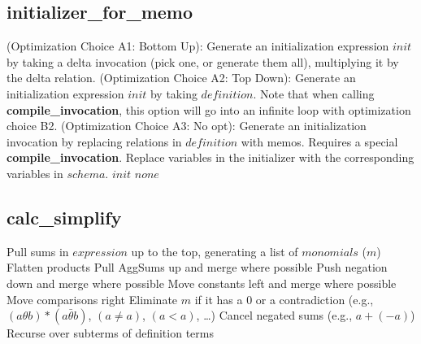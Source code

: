 \documentclass[11pt]{amsart}
\begin{document}
\subsection{initializer\_for\_memo}
\begin{algorithmic}
  \STATE (Optimization Choice A1: Bottom Up): Generate an initialization expression $init$ by taking a delta invocation (pick one, or generate them all), multiplying it by the delta relation.
  \STATE (Optimization Choice A2: Top Down): Generate an initialization expression $init$ by taking $definition$.  Note that when calling {\bf compile\_invocation}, this option will go into an infinite loop with optimization choice B2.
  \STATE (Optimization Choice A3: No opt): Generate an initialization invocation by replacing relations in $definition$ with memos.  Requires a special {\bf compile\_invocation}.
  \STATE Replace variables in the initializer with the corresponding variables in $schema$.
  \RETURN $init$
\ELSE
  \RETURN $none$
\ENDIF
\end{algorithmic}

\subsection{calc\_simplify}
\begin{algorithmic}
\STATE Pull sums in $expression$ up to the top, generating a list of $monomials$
  \REPEAT
    ($m$)
    \STATE Flatten products
    \STATE Pull AggSums up and merge where possible
    \STATE Push negation down and merge where possible
    \STATE Move constants left and merge where possible
    \STATE Move comparisons right
    \STATE Eliminate $m$ if it has a 0 or a contradiction (e.g., $(a \theta b) * (a \bar \theta b)$, $(a \neq a)$, $(a < a)$, \ldots)
    \STATE {}
  \STATE Cancel negated sums (e.g., $a + (- a)$)
  \STATE Recurse over subterms of definition terms
\ENDFOR
\STATE 
\end{algorithmic}
\end{document}
